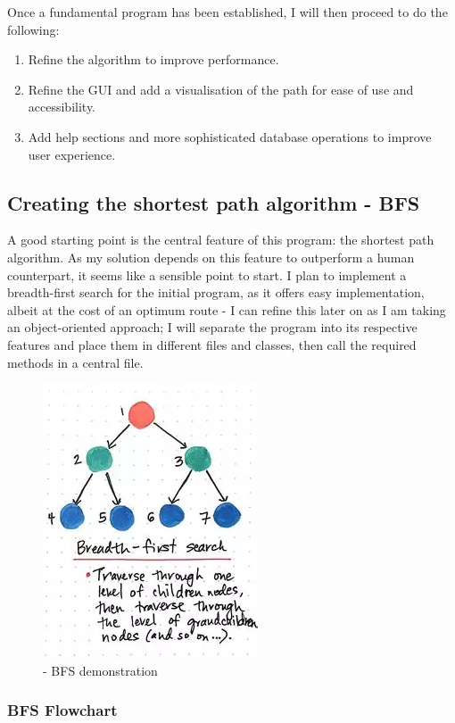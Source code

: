 Once a fundamental program has been established, I will then proceed to do the following:

\begin{enumerate}
    \item Refine the algorithm to improve performance.
    \item Refine the GUI and add a visualisation of the path for ease of use and accessibility.
    \item Add help sections and more sophisticated database operations to improve user experience.
\end{enumerate}

\subsection{Creating the shortest path algorithm - BFS}

A good starting point is the central feature of this program: the shortest path algorithm. As my solution depends on this feature to outperform a human counterpart, it seems like a sensible point to start. I plan to implement a breadth-first search for the initial program, as it offers easy implementation, albeit at the cost of an optimum route - I can refine this later on as I am taking an object-oriented approach; I will separate the program into its respective features and place them in different files and classes, then call the required methods in a central file.

\begin{figure}[!htbp]
    \centering
    \includegraphics[width=0.35\linewidth]{Images/bfsvdfs.png}
    \caption{- BFS demonstration \cite{bfsimg}}
\end{figure}

\newpage

\subsubsection{BFS Flowchart}

